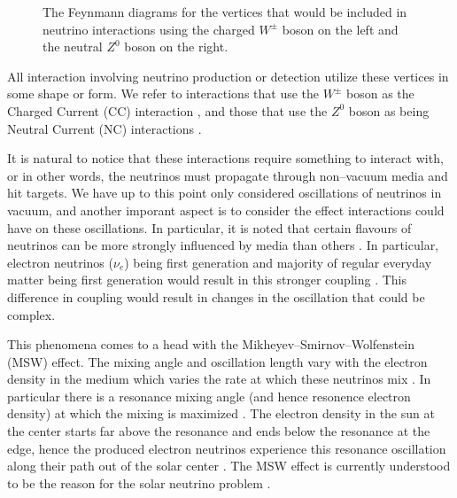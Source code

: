 \begin{figure}
  \centering
  \hspace{2em}
  \caption{The Feynmann diagrams for the vertices that would be included in neutrino interactions using the charged $W^{\pm}$ boson on the left and the neutral $Z^{0}$ boson on the right.}
  \label{fig:nvert}
\end{figure}

All interaction involving neutrino production or detection utilize these vertices in some shape or form. We refer to interactions that use the $W^{\pm}$ boson as the Charged Current (CC) interaction \cite{currents}, and those that use the $Z^{0}$ boson as being Neutral Current (NC) interactions \cite{currents}.

It is natural to notice that these interactions require something to interact with, or in other words, the neutrinos must propagate through non--vacuum media and hit targets. We have up to this point only considered oscillations of neutrinos in vacuum, and another imporant aspect is to consider the effect interactions could have on these oscillations. In particular, it is noted that certain flavours of neutrinos can be more strongly influenced by media than others \cite{solar_nu,msw}. In particular, electron neutrinos ($\nu_{e}$) being first generation and majority of regular everyday matter being first generation would result in this stronger coupling \cite{solar_nu,msw}. This difference in coupling would result in changes in the oscillation that could be complex.

This phenomena comes to a head with the Mikheyev–Smirnov–Wolfenstein (MSW) effect. The mixing angle and oscillation length vary with the electron density in the medium which varies the rate at which these neutrinos mix \cite{solar_nu,msw}. In particular there is a resonance mixing angle (and hence resonence electron density) at which the mixing is maximized \cite{solar_nu,msw}. The electron density in the sun at the center starts far above the resonance and ends below the resonance at the edge, hence the produced electron neutrinos experience this resonance oscillation along their path out of the solar center \cite{solar_nu,msw}. The MSW effect is currently understood to be the reason for the solar neutrino problem \cite{solar_nu}.

